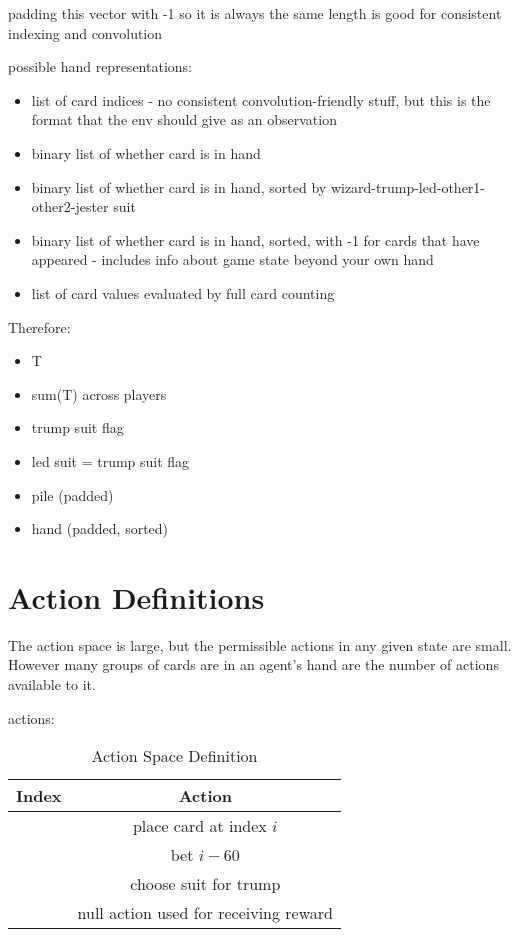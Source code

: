 \documentclass[10pt]{article} %
\begin{document}
padding this vector with -1 so it is always the same length is good for consistent indexing and convolution

possible hand representations:

\begin{itemize}
\item list of card indices - no consistent convolution-friendly stuff, but this is the format that the env should give as an observation
\item binary list of whether card is in hand
\item binary list of whether card is in hand, sorted by wizard-trump-led-other1-other2-jester suit
\item binary list of whether card is in hand, sorted, with -1 for cards that have appeared - includes info about game state beyond your own hand
\item list of card values evaluated by full card counting
\end{itemize}

Therefore:

\begin{itemize}
\item T
\item sum(T) across players
\item trump suit flag
\item led suit = trump suit flag
\item pile (padded)
\item hand (padded, sorted)
\end{itemize}

\section{Action Definitions}

The action space is large, but the permissible actions in any given state are small. However many groups of cards are in an agent’s hand are the number of actions available to it.

actions:

\begin{table}[h!]
\centering
\begin{tabular}{|c|c|} \hline
Index & Action \\ \hline
[0, 59] & place card at index $i$ \\ \hline
[60, 80] & bet $i-60$ \\ \hline
[81, 84] & choose suit for trump \\ \hline
[85] & null action used for receiving reward \\ \hline
\end{tabular}
\caption{Action Space Definition}
\end{table}
\end{document}
